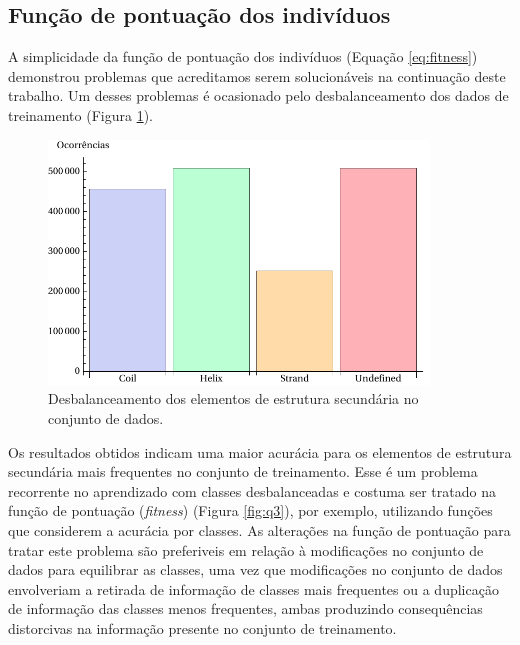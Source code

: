

\subsection{Função de pontuação dos indivíduos}

A simplicidade da função de pontuação dos indivíduos (Equação \ref{eq:fitness}) demonstrou problemas que acreditamos serem solucionáveis na continuação deste trabalho. Um desses problemas é ocasionado pelo desbalanceamento dos dados de treinamento (Figura \ref{fig:occ_ss}). 

\begin{figure}
  \centering
  \includegraphics[width=0.9\textwidth]{figures/occ_ss.pdf}
  \caption{Desbalanceamento dos elementos de estrutura secundária no conjunto de dados.}
        \label{fig:occ_ss}
\end{figure}

Os resultados obtidos indicam uma maior acurácia para os elementos de estrutura secundária mais frequentes no conjunto de treinamento. Esse é um problema recorrente no aprendizado com classes desbalanceadas e costuma ser tratado na função de pontuação (\textit{fitness}) (Figura \ref{fig:q3}), por exemplo, utilizando funções que considerem a acurácia por classes. As alterações na função de pontuação para tratar este problema são preferiveis em relação à modificações no conjunto de dados para equilibrar as classes, uma vez que modificações no conjunto de dados envolveriam a retirada de informação de classes mais frequentes ou a duplicação de informação das classes menos frequentes, ambas produzindo consequências distorcivas na informação presente no conjunto de treinamento.

